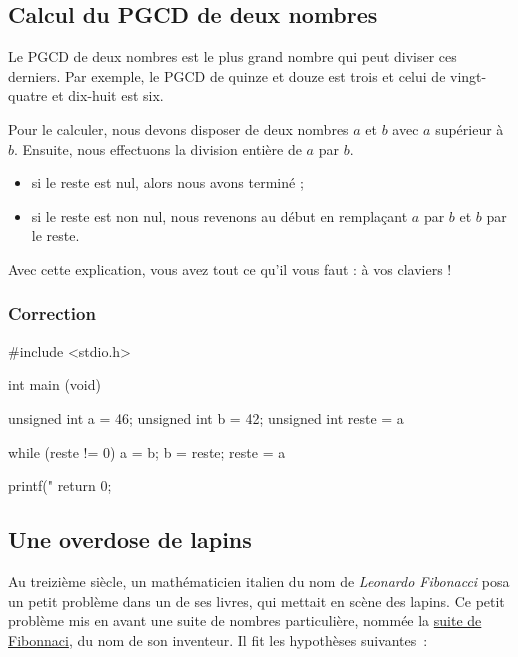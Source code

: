 \subsection{Calcul du PGCD de deux nombres}
\label{calcul-du-PGCD-de-deux-nombres}

Le PGCD de deux nombres est le plus grand nombre qui peut diviser ces
derniers. Par exemple, le PGCD de quinze et douze est trois et celui de
vingt-quatre et dix-huit est six.

Pour le calculer, nous devons disposer de deux nombres \(a\) et \(b\)
avec \(a\) supérieur à \(b\). Ensuite, nous effectuons la division
entière de \(a\) par \(b\).

\begin{itemize}
\item
  si le reste est nul, alors nous avons terminé ;
\item
  si le reste est non nul, nous revenons au début en remplaçant \(a\)
  par \(b\) et \(b\) par le reste.
\end{itemize}

Avec cette explication, vous avez tout ce qu'il vous faut : à vos
claviers !

\subsubsection*{Correction}
\label{correction-5}

\begin{C}
 #include <stdio.h>


int main (void)
{
    unsigned int a = 46;
    unsigned int b = 42;
    unsigned int reste = a %

    while (reste != 0)
    {
        a = b;
        b = reste;
        reste = a %
    }

    printf("%
    return 0;
}
\end{C}

\subsection{Une overdose de lapins}
\label{une-overdose-de-lapins}

Au treizième siècle, un mathématicien italien du nom de \emph{Leonardo
Fibonacci} posa un petit problème dans un de ses livres, qui mettait en
scène des lapins. Ce petit problème mis en avant une suite de nombres
particulière, nommée la
\href{http://fr.wikipedia.org/wiki/Suite_de_Fibonacci}{suite de
Fibonnaci}, du nom de son inventeur. Il fit les hypothèses suivantes~:

